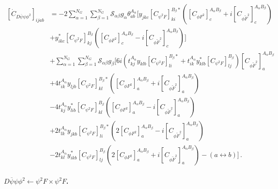 \begin{align}
    \left[\dot C_{D\overline \psi \psi \phi^2}\right]_{ijab} &= -2\sum_{\alpha=1}^{N_G} \sum_{\beta=1}^{N_G} \mathcal S_{\alpha\beta} g_\alpha \theta^{A_\alpha}_{ab}
    \Bigg[
    y_{jkc}
    \left[C_{\psi^2 F}\right]^{B_\beta *}_{ki}
    \left(
    \left[C_{\phi F^2}\right]^{A_\alpha B_\beta}_c + i \left[C_{\phi \widetilde F^2}\right]^{A_\alpha B_\beta}_c
    \right)
    \nonumber \\
    & + 
    y_{ikc}^*
    \left[C_{\psi^2 F}\right]^{B_\beta }_{kj}
    \left(
    \left[C_{\phi F^2}\right]^{A_\alpha B_\beta}_c - i \left[C_{\phi \widetilde F^2}\right]^{A_\alpha B_\beta}_c
    \right)
    \Bigg]
    \nonumber \\
    &+ 
    \sum_{\alpha=1}^{N_G} \sum_{\beta=1}^{N_G} \mathcal S_{\alpha\beta} g_\beta
    \Bigg[
    6i\left(t^{A_\alpha}_{kj} y_{klb} \left[C_{\psi^2 F}\right]^{B_\beta *}_{li} + t^{A_\alpha}_{ik} y_{klb}^* \left[C_{\psi^2 F}\right]^{B_\beta}_{lj}  \right)
    \left[C_{\phi \widetilde F^2}\right]^{A_\alpha B_\beta}_{a}
    \nonumber \\
    & + 4 
    t^{A_\alpha}_{ik}y_{ljb}\left[C_{\psi^2 F}\right]^{B_\beta *}_{kl}
    \left(
    \left[C_{\phi F^2}\right]^{A_\alpha B_\beta}_a + i \left[C_{\phi \widetilde F^2}\right]^{A_\alpha B_\beta}_a
    \right)
    \nonumber \\
    & - 4 
    t^{A_\alpha}_{kj}y^*_{lib}\left[C_{\psi^2 F}\right]^{B_\beta}_{kl}
    \left(
    \left[C_{\phi F^2}\right]^{A_\alpha B_\beta}_a - i \left[C_{\phi \widetilde F^2}\right]^{A_\alpha B_\beta}_a
    \right)
    \nonumber \\
    & + 2 
    t^{A_\alpha}_{lk}y_{jkb}\left[C_{\psi^2 F}\right]^{B_\beta *}_{li}
    \left(2
    \left[C_{\phi F^2}\right]^{A_\alpha B_\beta}_a - i \left[C_{\phi \widetilde F^2}\right]^{A_\alpha B_\beta}_a
    \right)
    \nonumber \\
    & - 2 
    t^{A_\alpha}_{kl}y^*_{ikb}\left[C_{\psi^2 F}\right]^{B_\beta}_{lj}
    \left(2
    \left[C_{\phi F^2}\right]^{A_\alpha B_\beta}_a + i \left[C_{\phi \widetilde F^2}\right]^{A_\alpha B_\beta}_a
    \right)-\left(a\leftrightarrow b\right)
    \Bigg]\,.
\end{align}

\paragraph{$D \overline \psi \psi \phi^2 \leftarrow \psi^2 F \times \psi^2 F$.}

